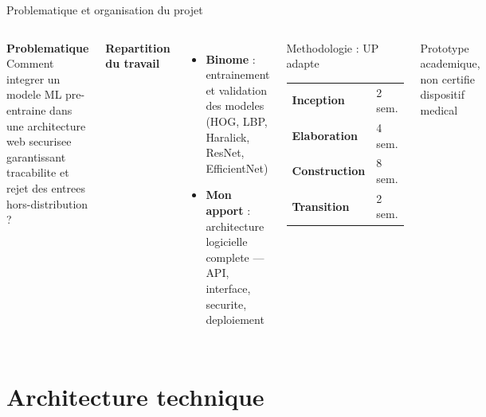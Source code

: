 \documentclass[aspectratio=169,11pt]{beamer}
\begin{document}
\begin{frame}{Problematique et organisation du projet}
\begin{columns}[T,onlytextwidth]
\textbf{Problematique}\\[4pt]
Comment integrer un modele ML pre-entraine dans une architecture web
securisee garantissant tracabilite et rejet des entrees hors-distribution ?

\vspace{0.8em}
\textbf{Repartition du travail}
\begin{itemize}
  \item \textcolor{accentA}{\textbf{Binome}} : entrainement et validation des modeles
        (HOG, LBP, Haralick, ResNet, EfficientNet)
  \item \textcolor{accentC}{\textbf{Mon apport}} : architecture logicielle complete ---
        API, interface, securite, deploiement
\end{itemize}

\begin{block}{Methodologie : UP adapte}
\begin{tabular}{@{}l l@{}}
\textbf{Inception}    & 2 sem. \\
\textbf{Elaboration}  & 4 sem. \\
\textbf{Construction} & 8 sem. \\
\textbf{Transition}   & 2 sem. \\
\end{tabular}
\end{block}
\vspace{0.5em}
\textcolor{muted}{\small Prototype academique, non certifie dispositif medical}
\end{columns}
\end{frame}

\section{Architecture technique}
\end{document}
